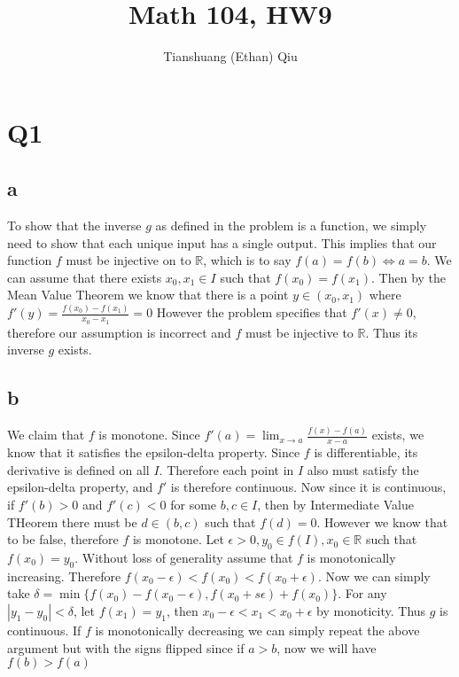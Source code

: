 \documentclass[12pt]{article}
\author{Tianshuang (Ethan) Qiu}
\newcommand{\R}{\mathbb{R}}
\begin{document}
\title{Math 104, HW9}
\maketitle
\newpage

\section{Q1}
\subsection{a}
To show that the inverse $g$ as defined in the problem is a function, we simply need to show that each unique input has a single output. This implies that our function $f$ must be injective on to $\R$, which is to say $f(a) = f(b) \iff a = b$.
\newline
We can assume that there exists $x_0, x_1 \in I$ such that $f(x_0) = f(x_1)$.
Then by the Mean Value Theorem we know that there is a point $y \in (x_0, x_1)$ where $f'(y) = \frac{f(x_0)-f(x_1)}{x_0-x_1}=0$
However the problem specifies that $f'(x) \not= 0$, therefore our assumption is incorrect and $f$ must be injective to $\R$. Thus its inverse $g$ exists.

\subsection{b}
We claim that $f$ is monotone. Since $f'(a) = \lim_{x \to a}\frac{f(x)-f(a)}{x-a}$ exists, we know that it satisfies the epsilon-delta property. Since $f$ is differentiable, its derivative is defined on all $I$. Therefore each point in $I$ also must satisfy the epsilon-delta property, and $f'$ is therefore continuous. Now since it is continuous, if $f'(b)>0$ and $f'(c)<0$ for some $b,c \in I$, then by Intermediate Value THeorem there must be $d \in (b,c)$ such that $f(d)=0$. However we know that to be false, therefore $f$ is monotone.
\newline
Let $\epsilon > 0, y_0 \in f(I), x_0 \in \R$ such that $f(x_0)=y_0$. Without loss of generality assume that $f$ is monotonically increasing. Therefore $f(x_0-\epsilon) < f(x_0) < f(x_0+\epsilon)$.
Now we can simply take $\delta = \min\{f(x_0)-f(x_0-\epsilon), f(x_0+s\epsilon) + f(x_0)\}$. For any $|y_1-y_0|<\delta$, let $f(x_1)=y_1$, then $x_0-\epsilon < x_1 < x_0 + \epsilon$ by monoticity. Thus $g$ is continuous.
\newline
If $f$ is monotonically decreasing we can simply repeat the above argument but with the signs flipped since if $a > b$, now we will have $f(b) > f(a)$
\newpage
\end{document}
